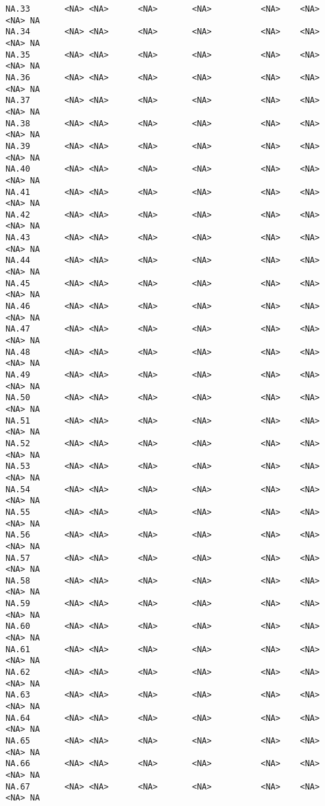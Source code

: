 \documentclass[
  letterpaper,
  DIV=11,
  numbers=noendperiod]{scrartcl}
\begin{document}
\begin{verbatim}
NA.33       <NA> <NA>      <NA>       <NA>          <NA>    <NA>    <NA> NA
NA.34       <NA> <NA>      <NA>       <NA>          <NA>    <NA>    <NA> NA
NA.35       <NA> <NA>      <NA>       <NA>          <NA>    <NA>    <NA> NA
NA.36       <NA> <NA>      <NA>       <NA>          <NA>    <NA>    <NA> NA
NA.37       <NA> <NA>      <NA>       <NA>          <NA>    <NA>    <NA> NA
NA.38       <NA> <NA>      <NA>       <NA>          <NA>    <NA>    <NA> NA
NA.39       <NA> <NA>      <NA>       <NA>          <NA>    <NA>    <NA> NA
NA.40       <NA> <NA>      <NA>       <NA>          <NA>    <NA>    <NA> NA
NA.41       <NA> <NA>      <NA>       <NA>          <NA>    <NA>    <NA> NA
NA.42       <NA> <NA>      <NA>       <NA>          <NA>    <NA>    <NA> NA
NA.43       <NA> <NA>      <NA>       <NA>          <NA>    <NA>    <NA> NA
NA.44       <NA> <NA>      <NA>       <NA>          <NA>    <NA>    <NA> NA
NA.45       <NA> <NA>      <NA>       <NA>          <NA>    <NA>    <NA> NA
NA.46       <NA> <NA>      <NA>       <NA>          <NA>    <NA>    <NA> NA
NA.47       <NA> <NA>      <NA>       <NA>          <NA>    <NA>    <NA> NA
NA.48       <NA> <NA>      <NA>       <NA>          <NA>    <NA>    <NA> NA
NA.49       <NA> <NA>      <NA>       <NA>          <NA>    <NA>    <NA> NA
NA.50       <NA> <NA>      <NA>       <NA>          <NA>    <NA>    <NA> NA
NA.51       <NA> <NA>      <NA>       <NA>          <NA>    <NA>    <NA> NA
NA.52       <NA> <NA>      <NA>       <NA>          <NA>    <NA>    <NA> NA
NA.53       <NA> <NA>      <NA>       <NA>          <NA>    <NA>    <NA> NA
NA.54       <NA> <NA>      <NA>       <NA>          <NA>    <NA>    <NA> NA
NA.55       <NA> <NA>      <NA>       <NA>          <NA>    <NA>    <NA> NA
NA.56       <NA> <NA>      <NA>       <NA>          <NA>    <NA>    <NA> NA
NA.57       <NA> <NA>      <NA>       <NA>          <NA>    <NA>    <NA> NA
NA.58       <NA> <NA>      <NA>       <NA>          <NA>    <NA>    <NA> NA
NA.59       <NA> <NA>      <NA>       <NA>          <NA>    <NA>    <NA> NA
NA.60       <NA> <NA>      <NA>       <NA>          <NA>    <NA>    <NA> NA
NA.61       <NA> <NA>      <NA>       <NA>          <NA>    <NA>    <NA> NA
NA.62       <NA> <NA>      <NA>       <NA>          <NA>    <NA>    <NA> NA
NA.63       <NA> <NA>      <NA>       <NA>          <NA>    <NA>    <NA> NA
NA.64       <NA> <NA>      <NA>       <NA>          <NA>    <NA>    <NA> NA
NA.65       <NA> <NA>      <NA>       <NA>          <NA>    <NA>    <NA> NA
NA.66       <NA> <NA>      <NA>       <NA>          <NA>    <NA>    <NA> NA
NA.67       <NA> <NA>      <NA>       <NA>          <NA>    <NA>    <NA> NA

\end{verbatim}
\end{document}
